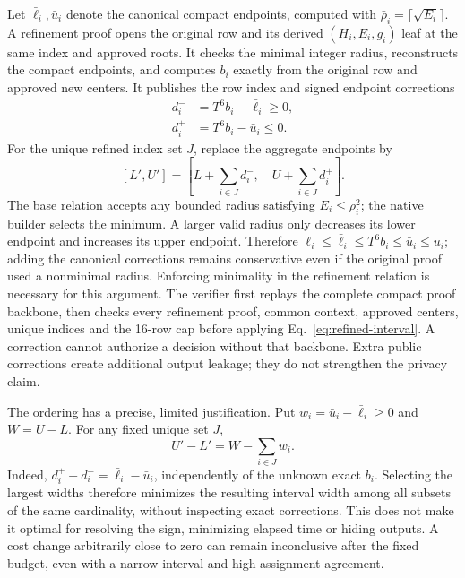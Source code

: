 Let $\bar\ell_i,\bar u_i$ denote the canonical compact endpoints, computed
with $\bar\rho_i=\lceil\sqrt{E_i}\rceil$. A refinement proof opens the original
row and its derived $(H_i,E_i,g_i)$ leaf at the same index and approved roots.
It checks the minimal integer radius, reconstructs the compact endpoints,
and computes $b_i$ exactly from the original row and approved new centers.
It publishes the row index and signed endpoint corrections
\begin{align}
 d_i^-&=T^6b_i-\bar\ell_i\geq0,\\
 d_i^+&=T^6b_i-\bar u_i\leq0.
\end{align}
For the unique refined index set $J$, replace the aggregate endpoints by
\begin{equation}\label{eq:refined-interval}
 [L',U']=\left[L+\sum_{i\in J}d_i^-,\quad
                    U+\sum_{i\in J}d_i^+\right].
\end{equation}
The base relation accepts any bounded radius satisfying $E_i\leq\rho_i^2$;
the native builder selects the minimum. A larger valid radius only
decreases its lower endpoint and increases its upper endpoint. Therefore
$\ell_i\leq\bar\ell_i\leq T^6b_i\leq\bar u_i\leq u_i$;
adding the canonical corrections remains conservative even if the original
proof used a nonminimal radius. Enforcing minimality in the refinement
relation is necessary for this argument. The verifier first replays the
complete compact proof backbone, then checks every refinement proof, common
context, approved centers, unique indices and the 16-row cap before applying
Eq.~\eqref{eq:refined-interval}. A correction cannot authorize a decision
without that backbone. Extra public corrections create additional output
leakage; they do not strengthen the privacy claim.

The ordering has a precise, limited justification. Put
$w_i=\bar u_i-\bar\ell_i\geq0$ and $W=U-L$. For any fixed unique set $J$,
\begin{equation}\label{eq:refinement-width}
 U'-L'=W-\sum_{i\in J}w_i.
\end{equation}
Indeed, $d_i^+-d_i^-=\bar\ell_i-\bar u_i$, independently of the unknown
exact $b_i$. Selecting the largest widths therefore minimizes the resulting
interval width among all subsets of the same cardinality, without inspecting
exact corrections. This does not make it optimal for resolving the sign,
minimizing elapsed time or hiding outputs. A cost change arbitrarily close
to zero can remain inconclusive after the fixed budget, even with a narrow
interval and high assignment agreement.

